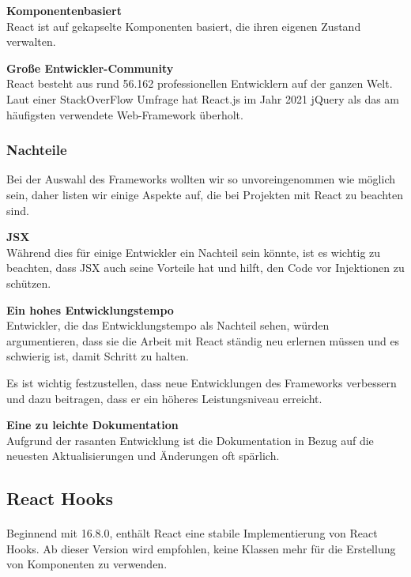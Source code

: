 \textbf{Komponentenbasiert}\\
React ist auf gekapselte Komponenten basiert, die ihren eigenen Zustand verwalten.
\newline

\textbf{Große Entwickler-Community}\\
React besteht aus rund 56.162 professionellen Entwicklern auf der ganzen Welt.
Laut einer StackOverFlow Umfrage hat React.js im Jahr 2021 jQuery als das am häufigsten verwendete Web-Framework überholt. {\cite{SO01}}
\newpage

\subsubsection{Nachteile}
Bei der Auswahl des Frameworks wollten wir so unvoreingenommen wie möglich sein, daher listen wir einige Aspekte auf, die bei Projekten mit React zu beachten sind.
\newline

\textbf{JSX}\\
Während dies für einige Entwickler ein Nachteil sein könnte, ist es wichtig zu beachten, dass JSX auch seine Vorteile hat und hilft, den Code vor Injektionen zu schützen.
\newline

\textbf{Ein hohes Entwicklungstempo}\\
Entwickler, die das Entwicklungstempo als Nachteil sehen, würden argumentieren, dass sie die Arbeit mit React ständig neu erlernen müssen und es schwierig ist, damit Schritt zu halten.

Es ist wichtig festzustellen, dass neue Entwicklungen des Frameworks verbessern und dazu beitragen, dass er ein höheres Leistungsniveau erreicht.
\newline

\textbf{Eine zu leichte Dokumentation}\\
Aufgrund der rasanten Entwicklung ist die Dokumentation in Bezug auf die neuesten Aktualisierungen und Änderungen oft spärlich.{\cite{R01}}

\subsection{React Hooks}
\paragraph{}
Beginnend mit 16.8.0, enthält React eine stabile Implementierung von React Hooks. Ab dieser Version wird empfohlen, keine Klassen mehr für die Erstellung von Komponenten zu verwenden.

